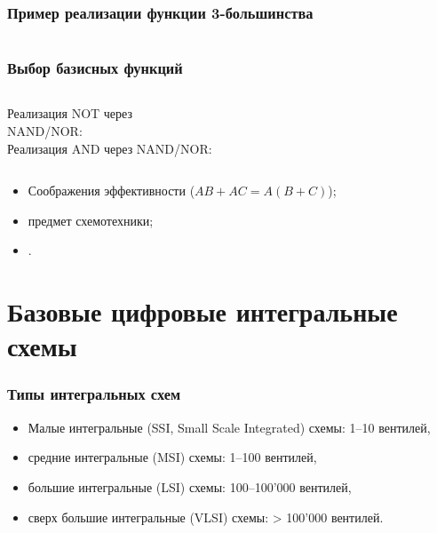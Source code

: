 \begin{frame}[plain]
\frametitle{Пример реализации функции 3-большинства}
\pause\begin{columns}
    \column{3cm} 
    \column{8cm}\pause \vspace{-.2cm}
\end{columns}
\end{frame}

\begin{frame}
\frametitle{Выбор базисных функций}

\vspace{1cm}\pause

\begin{columns}
    \column{5cm} Реализация NOT через\\NAND/NOR:\\
    \column{6cm} Реализация AND через NAND/NOR:\\
\end{columns}

\pause\begin{itemize}
    \item Соображения эффективности ($AB + AC = A(B+C)$);
    \item предмет схемотехники;
    \item {}.
\end{itemize}
\end{frame}

\section {Базовые цифровые интегральные схемы}

\begin{frame}
\frametitle{Типы интегральных схем}
\vspace{-.3cm}\pause\begin{itemize}
    \item Малые  интегральные (SSI, Small Scale Integrated) схемы: 1–10 вентилей,
    \item средние интегральные (MSI) схемы: 1–100 вентилей,
    \item большие интегральные (LSI) схемы: 100–100'000 вентилей,
    \item сверх большие интегральные (VLSI) схемы: > 100'000 вентилей.
\end{itemize}
\end{frame}


